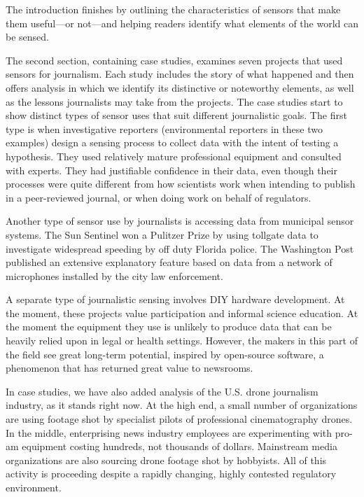 The introduction finishes by outlining the characteristics of sensors that
make them useful—or not—and helping readers identify what elements of
the world can be sensed.

The second section, containing case studies, examines seven projects that
used sensors for journalism. Each study includes the story of what happened
and then offers analysis in which we identify its distinctive or noteworthy
elements, as well as the lessons journalists may take from the projects.
The case studies start to show distinct types of sensor uses that suit different
journalistic goals. The first type is when investigative reporters (environmental
reporters in these two examples) design a sensing process to collect
data with the intent of testing a hypothesis. They used relatively mature professional
equipment and consulted with experts. They had justifiable confidence
in their data, even though their processes were quite different from
how scientists work when intending to publish in a peer-reviewed journal,
or when doing work on behalf of regulators.

Another type of sensor use by journalists is accessing data from municipal
sensor systems. The Sun Sentinel won a Pulitzer Prize by using tollgate data
to investigate widespread speeding by off duty Florida police. The Washington
Post published an extensive explanatory feature based on data from a
network of microphones installed by the city law enforcement.

A separate type of journalistic sensing involves DIY hardware development.
At the moment, these projects value participation and informal
science education. At the moment the equipment they use is unlikely to
produce data that can be heavily relied upon in legal or health settings.
However, the makers in this part of the field see great long-term potential,
inspired by open-source software, a phenomenon that has returned great
value to newsrooms.

In case studies, we have also added analysis of the U.S. drone journalism
industry, as it stands right now. At the high end, a small number of organizations
are using footage shot by specialist pilots of professional cinematography
drones. In the middle, enterprising news industry employees are
experimenting with pro-am equipment costing hundreds, not thousands of
dollars. Mainstream media organizations are also sourcing drone footage
shot by hobbyists. All of this activity is proceeding despite a rapidly changing,
highly contested regulatory environment.


